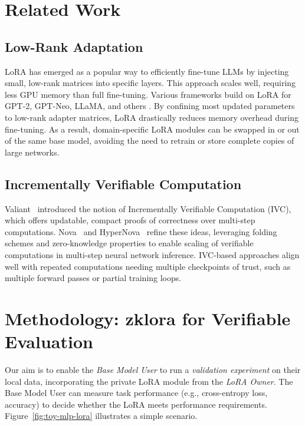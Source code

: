 \documentclass[11pt]{article}
\begin{document}
\section{Related Work}

\subsection{Low-Rank Adaptation}
LoRA \cite{hu2021lora} has emerged as a popular way to efficiently fine-tune LLMs by injecting small, low-rank matrices into specific layers. This approach scales well, requiring less GPU memory than full fine-tuning. Various frameworks build on LoRA for GPT-2, GPT-Neo, LLaMA, and others \cite{ding2022delta}. By confining most updated parameters to low-rank adapter matrices, LoRA drastically reduces memory overhead during fine-tuning. As a result, domain-specific LoRA modules can be swapped in or out of the same base model, avoiding the need to retrain or store complete copies of large networks.

\subsection{Incrementally Verifiable Computation}
Valiant~\cite{valiant2008incrementally} introduced the notion of Incrementally Verifiable Computation (IVC), which offers updatable, compact proofs of correctness over multi-step computations. Nova~\cite{kothapalli2022nova} and HyperNova~\cite{kothapalli2024hypernova} refine these ideas, leveraging folding schemes and zero-knowledge properties to enable scaling of verifiable computations in multi-step neural network inference. IVC-based approaches align well with repeated computations needing multiple checkpoints of trust, such as multiple forward passes or partial training loops.

\section{Methodology: zklora for Verifiable Evaluation}
Our aim is to enable the \emph{Base Model User} to run a \emph{validation experiment} on their local data, incorporating the private LoRA module from the \emph{LoRA Owner}. The Base Model User can measure task performance (e.g., cross-entropy loss, accuracy) to decide whether the LoRA meets performance requirements. Figure~\ref{fig:toy-mlp-lora} illustrates a simple scenario.
\end{document}
